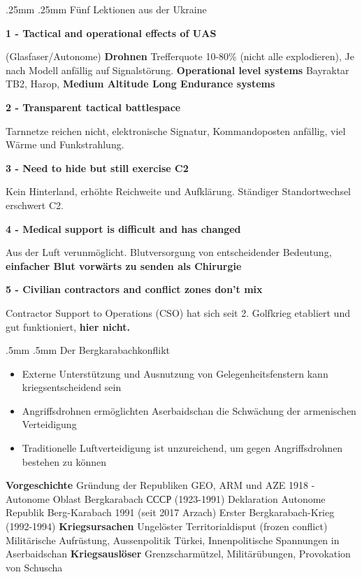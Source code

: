 {}\documentclass[a4paper,landscape,twoside]{article}
\makeatletter
\renewcommand{\section}{\@startsection{section}{1}{\z@}%
	{.5mm}%
	{.5mm}%
	{\normalfont\normalsize\bfseries}}
\renewcommand{\subsection}{\@startsection{subsection}{2}{\z@}%
	{.25mm}%
	{.25mm}%
	{\normalfont\small\bfseries}}
\makeatother
\begin{document}
\begin{multicols}{4}
	\subsection{Fünf Lektionen aus der Ukraine}

	\textbf{1 - Tactical and operational effects of UAS}

	(Glasfaser/Autonome) \textbf{Drohnen}
	Trefferquote 10-80\% (nicht alle explodieren),
	Je nach Modell anfällig auf Signalstörung.
	\textbf{Operational level systems}
	Bayraktar TB2,
	Harop,
	\textbf{Medium Altitude Long Endurance systems}

	\textbf{2 - Transparent tactical battlespace}

	Tarnnetze reichen nicht, elektronische Signatur,
	Kommandoposten anfällig, viel Wärme und Funkstrahlung.

	\textbf{3 - Need to hide but still exercise C2}

	Kein Hinterland, erhöhte Reichweite und Aufklärung.
	Ständiger Standortwechsel erschwert C2.

	\textbf{4 - Medical support is difficult and has changed}

	Aus der Luft verunmöglicht.
	Blutversorgung von entscheidender Bedeutung,
	\textbf{einfacher Blut vorwärts zu senden als Chirurgie}

	\textbf{5 - Civilian contractors and conflict zones don't mix}

	Contractor Support to Operations (CSO) hat sich seit 2. Golfkrieg
	etabliert und gut funktioniert, \textbf{hier nicht.}

	\section{Der Bergkarabachkonflikt}


	\begin{itemize}

		\item
		      Externe Unterstützung und Ausnutzung von Gelegenheitsfenstern
		      kann kriegsentscheidend sein
		\item
		      Angriffsdrohnen ermöglichten Aserbaidschan die Schwächung der
		      armenischen Verteidigung
		\item
		      Traditionelle Luftverteidigung ist unzureichend, um gegen
		      Angriffsdrohnen bestehen zu können
	\end{itemize}
	\vspace{1mm}
	\textbf{Vorgeschichte}
	Gründung der Republiken GEO, ARM und AZE 1918 -
	Autonome Oblast Bergkarabach СССР (1923-1991)
	Deklaration Autonome Republik Berg-Karabach 1991 (seit 2017 Arzach)
	Erster Bergkarabach-Krieg (1992-1994)
	\textbf{Kriegsursachen}
	Ungelöster Territorialdisput (frozen conflict)
	Militärische Aufrüstung,
	Aussenpolitik Türkei,
	Innenpolitische Spannungen in Aserbaidschan
	\textbf{Kriegsauslöser}
	Grenzscharmützel,
	Militärübungen,
	Provokation von Schuscha


\end{multicols}
\end{document}
